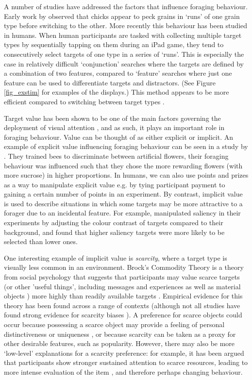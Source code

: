 \documentclass[12pt]{article}
\begin{document}
A number of studies have addressed the factors that influence foraging behaviour. Early work by \cite{dawkins1971} observed that chicks appear to peck grains in `runs' of one grain type before switching to the other. More recently \citep{kristjansson2014common} this behaviour has been studied in humans. When human participants are tasked with collecting multiple target types by sequentially tapping on them during an iPad game, they tend to consecutively select targets of one type in a series of `runs'. This is especially the case in relatively difficult `conjunction' searches where the targets are defined by a combination of two features, compared to `feature' searches where just one feature can be used to differentiate targets and distractors. (See Figure \ref{fig_exstim} for examples of the displays.) This method appears to be more efficient compared to switching between target types \citep{wolfe2019guidance}. 

Target value has been shown to be one of the main factors governing the deployment of visual attention \citep{wolfe2017five}, and as such, it plays an important role in foraging behaviour. Value can be thought of as either explicit or implicit. An example of explicit value influencing foraging behaviour can be seen in a study by \cite{nityananda2021different}. They trained bees to discriminate between artificial flowers, their foraging behaviour was influenced such that they chose the more rewarding flowers (with more sucrose) in higher proportions. In humans, we can also use points and prizes as a way to manipulate explicit value e.g. by tying participant payment to gaining a certain number of points in an experiment. By contrast, implicit value is used to describe situations in which some targets may be more attractive to a forager due to an incidental feature. For example, \cite{nityananda2021different} manipulated saliency in their experiments by adjusting the colour contrast of targets compared to their background, and found that higher saliency targets were more likely to be selected than lower ones.

One interesting example of implicit value is \textit{scarcity}, where a target type is visually less common in an environment. Brock's Commodity Theory is a theory from social psychology that suggests that participants may value scarce targets (or other 'useful things', including messages and experiences as well as material objects \citep{brock1992liberalization}) more highly than readily available targets \citep{brock1968implications}. Empirical evidence for this theory has been found across a range of contexts \citep{lynn1991scarcity} (although not all studies have found strong evidence for scarcity biases \citep[e.g.][]{echelbarger2017value}). A preference for scarce objects could occur because possessing a scarce object may provide a feeling of personal distinctiveness or uniqueness \citep{lynn1991scarcity}, or because scarcity can be taken as a proxy for other desirable features, such as popularity. However, there may also be more `low-level' explanations for a scarcity preference: for example, it has been argued that participants show stronger sustained attention to scarce resources, leading to more intense evaluation of the item \citep{sehnert2014scarcity}, and therefore perhaps changing behaviour.
\end{document}
